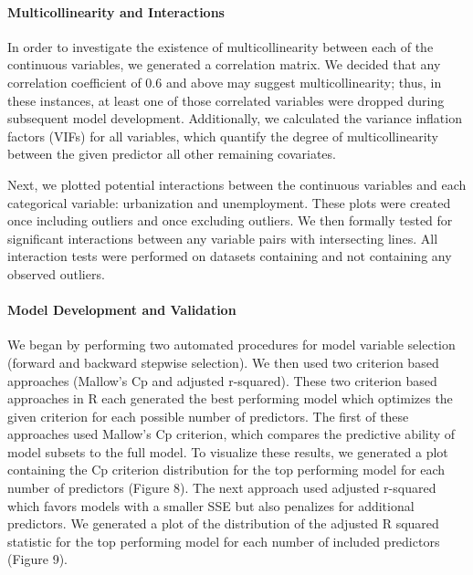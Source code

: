 \documentclass[
]{article}
\begin{document}
\hypertarget{multicollinearity-and-interactions}{%
\paragraph{Multicollinearity and
Interactions}\label{multicollinearity-and-interactions}}

In order to investigate the existence of multicollinearity between each
of the continuous variables, we generated a correlation matrix. We
decided that any correlation coefficient of 0.6 and above may suggest
multicollinearity; thus, in these instances, at least one of those
correlated variables were dropped during subsequent model development.
Additionally, we calculated the variance inflation factors (VIFs) for
all variables, which quantify the degree of multicollinearity between
the given predictor all other remaining covariates.

Next, we plotted potential interactions between the continuous variables
and each categorical variable: urbanization and unemployment. These
plots were created once including outliers and once excluding outliers.
We then formally tested for significant interactions between any
variable pairs with intersecting lines. All interaction tests were
performed on datasets containing and not containing any observed
outliers.

\hypertarget{model-development-and-validation}{%
\paragraph{Model Development and
Validation}\label{model-development-and-validation}}

We began by performing two automated procedures for model variable
selection (forward and backward stepwise selection). We then used two
criterion based approaches (Mallow's Cp and adjusted r-squared). These
two criterion based approaches in R each generated the best performing
model which optimizes the given criterion for each possible number of
predictors. The first of these approaches used Mallow's Cp criterion,
which compares the predictive ability of model subsets to the full
model. To visualize these results, we generated a plot containing the Cp
criterion distribution for the top performing model for each number of
predictors (Figure 8). The next approach used adjusted r-squared which
favors models with a smaller SSE but also penalizes for additional
predictors. We generated a plot of the distribution of the adjusted R
squared statistic for the top performing model for each number of
included predictors (Figure 9).
\end{document}
